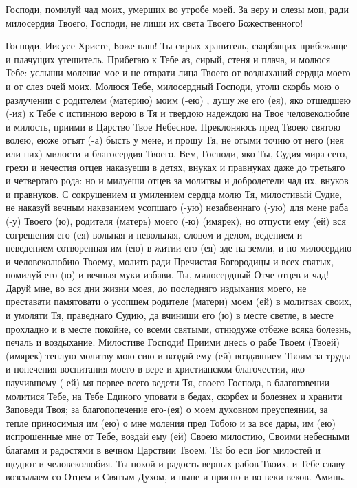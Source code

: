 \mychapterending{}



Господи, помилуй чад моих, умерших во утробе моей. За веру и слезы мои, ради милосердия Твоего, Господи, не лиши их света Твоего Божественного! 

\mychapterending

\begin{mymulticols}


Господи, Иисусе Христе, Боже наш! Ты сирых хранитель, скорбящих прибежище и плачущих утешитель. Прибегаю к Тебе аз, сирый, стеня и плача, и молюся Тебе: услыши моление мое и не отврати лица Твоего от воздыханий сердца моего и от слез очей моих. Молюся Тебе, милосердный Господи, утоли скорбь мою о разлучении с родителем (материю) моим (-ею) , душу же его (ея), яко отшедшею (-ия) к Тебе с истинною верою в Тя и твердою надеждою на Твое человеколюбие и милость, приими в Царство Твое Небесное. Преклоняюсь пред Твоею святою волею, еюже отъят (-а) бысть у мене, и прошу Тя, не отыми точию от него (нея или них) милости и благосердия Твоего. Вем, Господи, яко Ты, Судия мира сего, грехи и нечестия отцев наказуеши в детях, внуках и правнуках даже до третьяго и четвертаго рода: но и милуеши отцев за молитвы и добродетели чад их, внуков и правнуков. С сокрушением и умилением сердца молю Тя, милостивый Судие, не наказуй вечным наказанием усопшаго (-ую) незабвеннаго (-ую) для мене раба (-у) Твоего (ю), родителя (матерь) моего (-ю) (имярек), но отпусти ему (ей) вся согрешения его (ея) вольная и невольная, словом и делом, ведением и неведением сотворенная им (ею) в житии его (ея) зде на земли, и по милосердию и человеколюбию Твоему, молитв ради Пречистая Богородицы и всех святых, помилуй его (ю) и вечныя муки избави. Ты, милосердный Отче отцев и чад! Даруй мне, во вся дни жизни моея, до последняго издыхания моего, не преставати памятовати о усопшем родителе (матери) моем (ей) в молитвах своих, и умоляти Тя, праведнаго Судию, да вчиниши его (ю) в месте светле, в месте прохладно и в месте покойне, со всеми святыми, отнюдуже отбеже всяка болезнь, печаль и воздыхание. Милостиве Господи! Приими днесь о рабе Твоем (Твоей) (имярек) теплую молитву мою сию и воздай ему (ей) воздаянием Твоим за труды и попечения воспитания моего в вере и христианском благочестии, яко научившему (-ей) мя первее всего ведети Тя, своего Господа, в благоговении молитися Тебе, на Тебе Единого уповати в бедах, скорбех и болезнех и хранити Заповеди Твоя; за благопопечение его-(ея) о моем духовном преуспеянии, за тепле приносимыя им (ею) о мне моления пред Тобою и за все дары, им (ею) испрошенные мне от Тебе, воздай ему (ей) Своею милостию, Своими небесными благами и радостями в вечном Царствии Твоем. Ты бо еси Бог милостей и щедрот и человеколюбия. Ты покой и радость верных рабов Твоих, и Тебе славу возсылаем со Отцем и Святым Духом, и ныне и присно и во веки веков. Аминь. 

\end{mymulticols}

